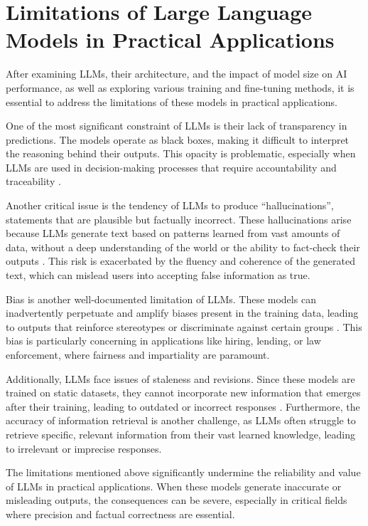 \section{Limitations of Large Language Models in Practical Applications}

After examining LLMs, their architecture, and the impact of model size on AI performance, as well as exploring various training and fine-tuning methods, it is essential to address the limitations of these models in practical applications.

One of the most significant constraint of LLMs is their lack of transparency in predictions. The models operate as black boxes, making it difficult to interpret the reasoning behind their outputs. This opacity is problematic, especially when LLMs are used in decision-making processes that require accountability and traceability \cite{rudin2019stop}.

Another critical issue is the tendency of LLMs to produce “hallucinations”, statements that are plausible but factually incorrect. These hallucinations arise because LLMs generate text based on patterns learned from vast amounts of data, without a deep understanding of the world or the ability to fact-check their outputs \cite{maynez2020faithfulness}. This risk is exacerbated by the fluency and coherence of the generated text, which can mislead users into accepting false information as true.

Bias is another well-documented limitation of LLMs. These models can inadvertently perpetuate and amplify biases present in the training data, leading to outputs that reinforce stereotypes or discriminate against certain groups \cite{bender2021dangers}. This bias is particularly concerning in applications like hiring, lending, or law enforcement, where fairness and impartiality are paramount.

Additionally, LLMs face issues of staleness and revisions. Since these models are trained on static datasets, they cannot incorporate new information that emerges after their training, leading to outdated or incorrect responses \cite{dhingra2022time}. Furthermore, the accuracy of information retrieval is another challenge, as LLMs often struggle to retrieve specific, relevant information from their vast learned knowledge, leading to irrelevant or imprecise responses.

The limitations mentioned above significantly undermine the reliability and value of LLMs in practical applications. When these models generate inaccurate or misleading outputs, the consequences can be severe, especially in critical fields where precision and factual correctness are essential.

